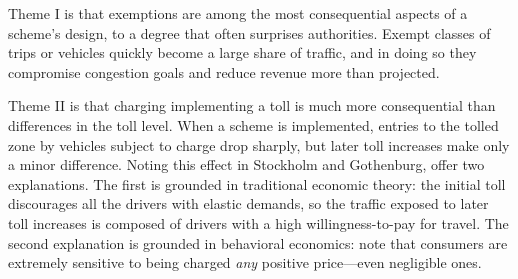 Theme I is that exemptions are among the most consequential aspects of a scheme's design, to a degree that often surprises authorities. Exempt classes of trips or vehicles quickly become a large share of traffic, and in doing so they compromise congestion goals and reduce revenue more than projected.

Theme II is that charging implementing a toll is much more consequential than differences in the toll level. When a scheme is implemented, entries to the tolled zone by vehicles subject to charge drop sharply, but later toll increases make only a minor difference. Noting this effect in Stockholm and Gothenburg, \citet[p. 45]{Borjesson2018} offer two explanations. The first is grounded in traditional economic theory: the initial toll discourages all the drivers with elastic demands, so the traffic exposed to later toll increases is composed of drivers with a high willingness-to-pay for travel. The second explanation is grounded in behavioral economics: \citet{Shampanier2007} note that consumers are extremely sensitive to being charged \emph{any} positive price---even negligible ones.

